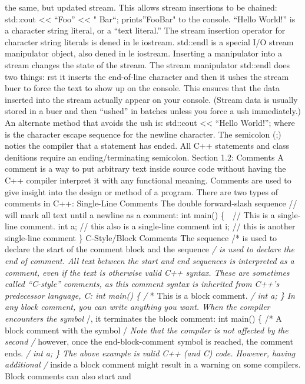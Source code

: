the same, but updated stream. This allows stream insertions to be
chained: std::cout \textless\textless{} ``Foo'' \textless\textless{} "
Bar``; prints''FooBar" to the console. ``Hello World!'' is a character
string literal, or a ``text literal.'' The stream insertion operator for
character string literals is dened in le iostream. std::endl is a
special I/O stream manipulator object, also dened in le iostream.
Inserting a manipulator into a stream changes the state of the stream.
The stream manipulator std::endl does two things: rst it inserts the
end-of-line character and then it ushes the stream buer to force the
text to show up on the console. This ensures that the data inserted into
the stream actually appear on your console. (Stream data is usually
stored in a buer and then ``ushed'' in batches unless you force a ush
immediately.) An alternate method that avoids the ush is: std::cout
\textless\textless{} ``Hello World!\n''; where \n is the character
escape sequence for the newline character. The semicolon (;) noties the
compiler that a statement has ended. All C++ statements and class
denitions require an ending/terminating semicolon. Section 1.2: Comments
A comment is a way to put arbitrary text inside source code without
having the C++ compiler interpret it with any functional meaning.
Comments are used to give insight into the design or method of a
program. There are two types of comments in C++: Single-Line Comments
The double forward-slash sequence // will mark all text until a newline
as a comment: int main() \{  // This is a single-line comment. int a;
// this also is a single-line comment int i; // this is another
single-line comment \} C-Style/Block Comments The sequence /* is used to
declare the start of the comment block and the sequence \emph{/ is used
to declare the end of comment. All text between the start and end
sequences is interpreted as a comment, even if the text is otherwise
valid C++ syntax. These are sometimes called ``C-style'' comments, as
this comment syntax is inherited from C++'s predecessor language, C: int
main() \{ /} * This is a block comment. \emph{/ int a; \} In any block
comment, you can write anything you want. When the compiler encounters
the symbol }/, it terminates the block comment: int main() \{ /* A block
comment with the symbol /\emph{ Note that the compiler is not affected
by the second /} however, once the end-block-comment symbol is reached,
the comment ends. \emph{/ int a; \} The above example is valid C++ (and
C) code. However, having additional /} inside a block comment might
result in a warning on some compilers. Block comments can also start and

